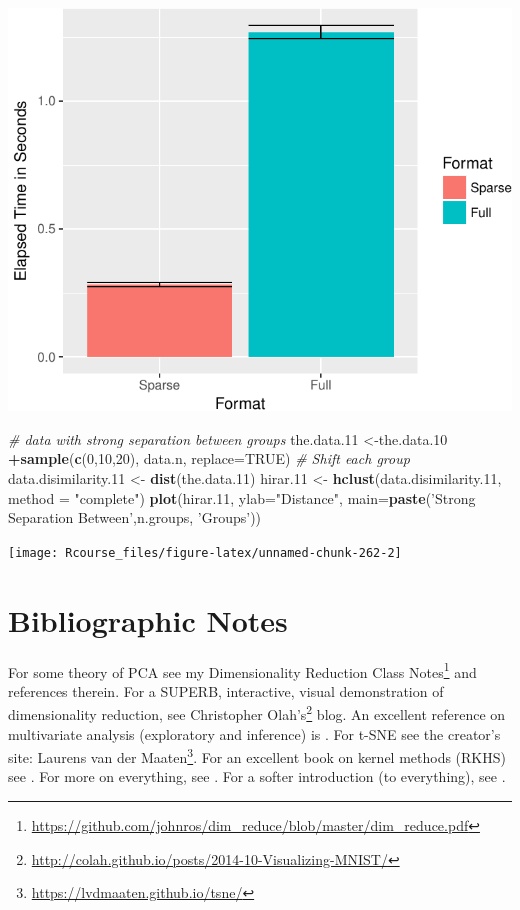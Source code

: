\documentclass[]{book}
\newenvironment{Shaded}{\begin{snugshade}}{\end{snugshade}}
\newcommand{\CommentTok}[1]{\textcolor[rgb]{0.56,0.35,0.01}{\textit{#1}}}
\newcommand{\DataTypeTok}[1]{\textcolor[rgb]{0.13,0.29,0.53}{#1}}
\newcommand{\DecValTok}[1]{\textcolor[rgb]{0.00,0.00,0.81}{#1}}
\newcommand{\FloatTok}[1]{\textcolor[rgb]{0.00,0.00,0.81}{#1}}
\newcommand{\KeywordTok}[1]{\textcolor[rgb]{0.13,0.29,0.53}{\textbf{#1}}}
\newcommand{\NormalTok}[1]{#1}
\newcommand{\OperatorTok}[1]{\textcolor[rgb]{0.81,0.36,0.00}{\textbf{#1}}}
\newcommand{\OtherTok}[1]{\textcolor[rgb]{0.56,0.35,0.01}{#1}}
\newcommand{\StringTok}[1]{\textcolor[rgb]{0.31,0.60,0.02}{#1}}
\renewcommand{\href}[2]{#2\footnote{\url{#1}}}
\theoremstyle{definition}
\theoremstyle{definition}
\theoremstyle{definition}
\theoremstyle{remark}
\begin{document}
\includegraphics[width=0.5\linewidth]{Rcourse_files/figure-latex/unnamed-chunk-262-1}

\begin{Shaded}
\begin{Highlighting}[]
\CommentTok{# data with strong separation between groups}
\NormalTok{the.data}\FloatTok{.11}\NormalTok{ <-the.data}\FloatTok{.10} \OperatorTok{+}\KeywordTok{sample}\NormalTok{(}\KeywordTok{c}\NormalTok{(}\DecValTok{0}\NormalTok{,}\DecValTok{10}\NormalTok{,}\DecValTok{20}\NormalTok{), data.n, }\DataTypeTok{replace=}\OtherTok{TRUE}\NormalTok{) }\CommentTok{# Shift each group }
\NormalTok{data.disimilarity}\FloatTok{.11}\NormalTok{ <-}\StringTok{ }\KeywordTok{dist}\NormalTok{(the.data}\FloatTok{.11}\NormalTok{)}
\NormalTok{hirar}\FloatTok{.11}\NormalTok{ <-}\StringTok{ }\KeywordTok{hclust}\NormalTok{(data.disimilarity}\FloatTok{.11}\NormalTok{, }\DataTypeTok{method =} \StringTok{"complete"}\NormalTok{)}
\KeywordTok{plot}\NormalTok{(hirar}\FloatTok{.11}\NormalTok{, }\DataTypeTok{ylab=}\StringTok{"Distance"}\NormalTok{, }\DataTypeTok{main=}\KeywordTok{paste}\NormalTok{(}\StringTok{'Strong Separation Between'}\NormalTok{,n.groups, }\StringTok{'Groups'}\NormalTok{))}
\end{Highlighting}
\end{Shaded}

\texttt{[image: Rcourse\_files/figure-latex/unnamed-chunk-262-2]}

\hypertarget{bibliographic-notes-9}{%
\section{Bibliographic Notes}\label{bibliographic-notes-9}}

For some theory of PCA see my \href{https://github.com/johnros/dim_reduce/blob/master/dim_reduce.pdf}{Dimensionality Reduction Class Notes} and references therein.
For a SUPERB, interactive, visual demonstration of dimensionality reduction, see \href{http://colah.github.io/posts/2014-10-Visualizing-MNIST/}{Christopher Olah's} blog.
An excellent reference on multivariate analysis (exploratory and inference) is \citet{izenman2008modern}.
For t-SNE see the creator's site: \href{https://lvdmaaten.github.io/tsne/}{Laurens van der Maaten}.
For an excellent book on kernel methods (RKHS) see \citet{shawe2004kernel}.
For more on everything, see \citet{friedman2001elements}.
For a softer introduction (to everything), see \citet{james2013introduction}.
\end{document}

